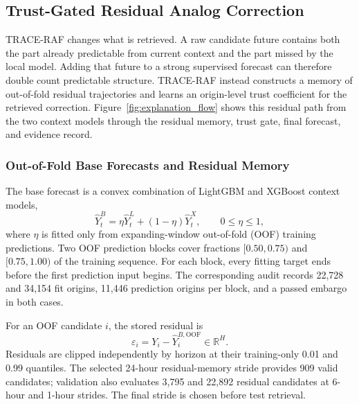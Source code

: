 \documentclass{ieeeaccess}
\begin{document}
\subsection{Trust-Gated Residual Analog Correction}

TRACE-RAF changes what is retrieved. A raw candidate future contains both the
part already predictable from current context and the part missed by the local
model. Adding that future to a strong supervised forecast can therefore double
count predictable structure. TRACE-RAF instead constructs a memory of
out-of-fold residual trajectories and learns an origin-level trust coefficient
for the retrieved correction. Figure~\ref{fig:explanation_flow} shows this
residual path from the two context models through the residual memory, trust
gate, final forecast, and evidence record.

\subsubsection{Out-of-Fold Base Forecasts and Residual Memory}
The base forecast is a convex combination of LightGBM and XGBoost context
models,
\begin{equation}
\hat{Y}^{B}_t=\eta\hat{Y}^{L}_t+(1-\eta)\hat{Y}^{X}_t,
\qquad 0\leq\eta\leq1,
\label{eq:trace_base}
\end{equation}
where $\eta$ is fitted only from expanding-window out-of-fold (OOF) training
predictions. Two OOF prediction blocks cover fractions $[0.50,0.75)$ and
$[0.75,1.00)$ of the training sequence. For each block, every fitting target
ends before the first prediction input begins. The corresponding audit records
22,728 and 34,154 fit origins, 11,446 prediction origins per block, and a passed
embargo in both cases.

For an OOF candidate $i$, the stored residual is
\begin{equation}
\varepsilon_i=Y_i-\hat{Y}^{B,\mathrm{OOF}}_i\in\mathbb{R}^{H}.
\label{eq:oof_residual}
\end{equation}
Residuals are clipped independently by horizon at their training-only 0.01 and
0.99 quantiles. The selected 24-hour residual-memory stride provides 909 valid
candidates; validation also evaluates 3,795 and 22,892 residual candidates at
6-hour and 1-hour strides. The final stride is chosen before test retrieval.
\end{document}
